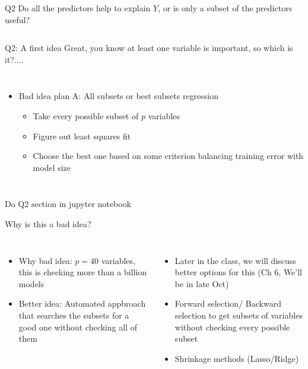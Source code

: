 \documentclass[aspectratio=169,usenames,dvipsnames]{beamer}
\newcommand{\InstructorList}[1]{
\begin{itemize}
	\color{orange}
	#1
\end{itemize}
}
\begin{document}
\begin{frame}

\begin{columns}
\centering
\begin{block}
	{Q2}
Do all the predictors help to explain $Y$, or is only a subset of the predictors useful?
\end{block}

\end{columns}

\end{frame}
\begin{frame}[t]{Q2: A first idea}
{Great, you know at least one variable is important, so which is it?....}
\begin{columns}
\centering
\InstructorList{
\item Bad idea plan A: All subsets or best subsets regression
	\InstructorList{
		\item Take every possible subset of $p$ variables
		\item Figure out least squares fit
		\item Choose the best one based on some criterion balancing training error with model size
	}
}
\centering
\end{columns}

\end{frame}
{
\begin{frame}[c]{}

	\centering 
	Do Q2 section in jupyter notebook 

\end{frame}
}

\begin{frame}[t]{Why is this a bad idea?}
\begin{columns}
\centering
\InstructorList{
\item Why bad idea: $p=40$ variables, this is checking more than a billion models
\item Better idea: Automated appbroach that searches the subsets for a good one without checking all of them
}
\centering
\InstructorList{
  \item Later in the class, we will discuss better options for this (Ch 6, We'll be in late Oct)
  \item Forward selection/ Backward selection to get subsets of variables without checking every possible subset 
  \item Shrinkage methods (Lasso/Ridge)
}

\end{columns}
\end{frame}
\end{document}
